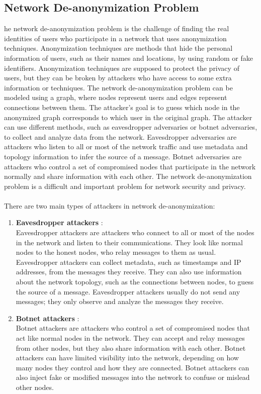 \documentclass{report}
\begin{document}
\subsection{Network De-anonymization Problem}
he network de-anonymization problem is the challenge of finding the real identities of users who participate in a network that uses anonymization techniques. Anonymization techniques are methods that hide the personal information of users, such as their names and locations, by using random or fake identifiers. Anonymization techniques are supposed to protect the privacy of users, but they can be broken by attackers who have access to some extra information or techniques. The network de-anonymization problem can be modeled using a graph, where nodes represent users and edges represent connections between them. The attacker’s goal is to guess which node in the anonymized graph corresponds to which user in the original graph. The attacker can use different methods, such as eavesdropper adversaries or botnet adversaries, to collect and analyze data from the network. Eavesdropper adversaries are attackers who listen to all or most of the network traffic and use metadata and topology information to infer the source of a message. Botnet adversaries are attackers who control a set of compromised nodes that participate in the network normally and share information with each other. The network de-anonymization problem is a difficult and important problem for network security and privacy.\\\\
There are two main types of attackers in network de-anonymization:
\begin{enumerate}
	\item \textbf{Eavesdropper attackers} :\\ Eavesdropper attackers are attackers who connect to all or most of the nodes in the network and listen to their communications. They look like normal nodes to the honest nodes, who relay messages to them as usual. Eavesdropper attackers can collect metadata, such as timestamps and IP addresses, from the messages they receive. They can also use information about the network topology, such as the connections between nodes, to guess the source of a message. Eavesdropper attackers usually do not send any messages; they only observe and analyze the messages they receive.
	\item \textbf{Botnet attackers} : \\
	Botnet attackers are attackers who control a set of compromised nodes that act like normal nodes in the network. They can accept and relay messages from other nodes, but they also share information with each other. Botnet attackers can have limited visibility into the network, depending on how many nodes they control and how they are connected. Botnet attackers can also inject fake or modified messages into the network to confuse or mislead other nodes.
\end{enumerate}
\end{document}
